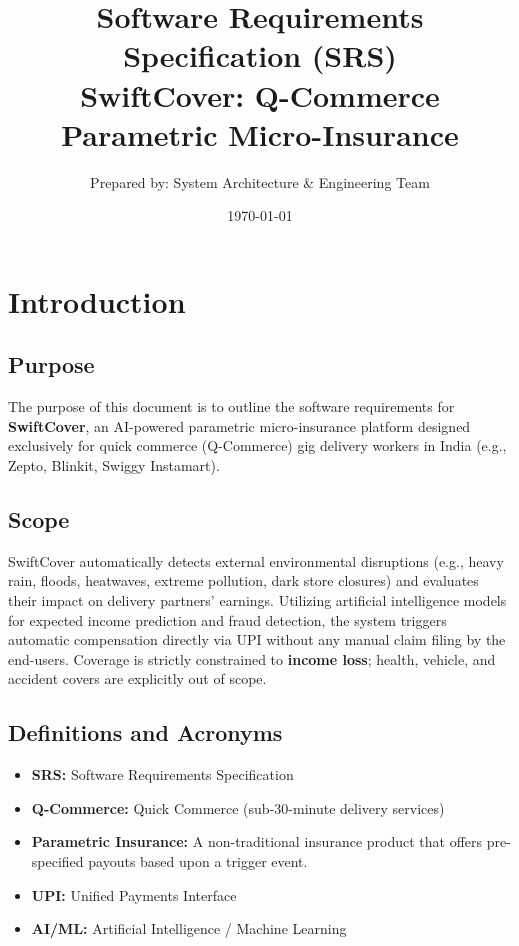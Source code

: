 \documentclass[12pt,a4paper]{article}
\title{\textbf{Software Requirements Specification (SRS)} \\ \vspace{0.5cm} \Large{SwiftCover: Q-Commerce Parametric Micro-Insurance}}
\author{Prepared by: System Architecture \& Engineering Team}
\date{\vspace{1cm} \today}
\begin{document}
\maketitle
\thispagestyle{empty}
\newpage

\tableofcontents
\newpage

\section{Introduction}

\subsection{Purpose}
The purpose of this document is to outline the software requirements for \textbf{SwiftCover}, an AI-powered parametric micro-insurance platform designed exclusively for quick commerce (Q-Commerce) gig delivery workers in India (e.g., Zepto, Blinkit, Swiggy Instamart).

\subsection{Scope}
SwiftCover automatically detects external environmental disruptions (e.g., heavy rain, floods, heatwaves, extreme pollution, dark store closures) and evaluates their impact on delivery partners' earnings. Utilizing artificial intelligence models for expected income prediction and fraud detection, the system triggers automatic compensation directly via UPI without any manual claim filing by the end-users. Coverage is strictly constrained to \textbf{income loss}; health, vehicle, and accident covers are explicitly out of scope.

\subsection{Definitions and Acronyms}
\begin{itemize}[label=--]
    \item \textbf{SRS:} Software Requirements Specification
    \item \textbf{Q-Commerce:} Quick Commerce (sub-30-minute delivery services)
    \item \textbf{Parametric Insurance:} A non-traditional insurance product that offers pre-specified payouts based upon a trigger event.
    \item \textbf{UPI:} Unified Payments Interface
    \item \textbf{AI/ML:} Artificial Intelligence / Machine Learning
\end{itemize}
\end{document}

